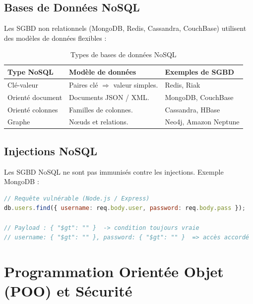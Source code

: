 \subsection{Bases de Données NoSQL}
Les SGBD non relationnels (MongoDB, Redis, Cassandra, CouchBase) utilisent des modèles de données flexibles :

\begin{table}[H]
\centering
\small
\begin{tabular}{p{3cm}p{4cm}p{4.5cm}}
    \toprule
    \textbf{Type NoSQL} & \textbf{Modèle de données} & \textbf{Exemples de SGBD} \\
    \midrule
    Clé-valeur       & Paires clé $\Rightarrow$ valeur simples. & Redis, Riak \\
    Orienté document & Documents JSON / XML. & MongoDB, CouchBase \\
    Orienté colonnes & Familles de colonnes. & Cassandra, HBase \\
    Graphe           & Nœuds et relations. & Neo4j, Amazon Neptune \\
    \bottomrule
\end{tabular}
\caption{Types de bases de données NoSQL}
\end{table}

\subsection{Injections NoSQL}
Les SGBD NoSQL ne sont pas immunisés contre les injections. Exemple MongoDB :
\begin{lstlisting}[language=javascript, caption=Injection NoSQL MongoDB]
// Requête vulnérable (Node.js / Express)
db.users.find({ username: req.body.user, password: req.body.pass });

// Payload : { "$gt": "" }  -> condition toujours vraie
// username: { "$gt": "" }, password: { "$gt": "" }  => accès accordé
\end{lstlisting}

\section{Programmation Orientée Objet (POO) et Sécurité}

